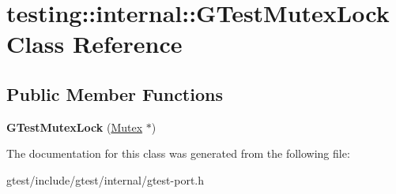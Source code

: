 \hypertarget{classtesting_1_1internal_1_1GTestMutexLock}{}\section{testing\+:\+:internal\+:\+:G\+Test\+Mutex\+Lock Class Reference}
\label{classtesting_1_1internal_1_1GTestMutexLock}
\subsection*{Public Member Functions}
\begin{DoxyCompactItemize}
\item 
\mbox{\label{classtesting_1_1internal_1_1GTestMutexLock_a77e3cba326d5356b4a1dea3790559c26}} 
{\bfseries G\+Test\+Mutex\+Lock} (\hyperlink{classtesting_1_1internal_1_1Mutex}{Mutex} $\ast$)
\end{DoxyCompactItemize}


The documentation for this class was generated from the following file\+:\begin{DoxyCompactItemize}
\item 
gtest/include/gtest/internal/gtest-\/port.\+h\end{DoxyCompactItemize}
